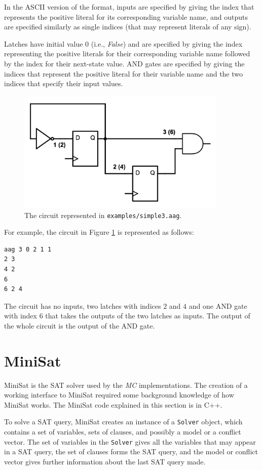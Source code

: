 \documentclass[12pt,a4paper,twoside,openright]{report}
\begin{document}
{{In the ASCII version of the format, inputs are specified by giving the
index that represents the positive literal for its corresponding variable name,
and outputs are specified similarly as single indices (that may represent
literals of any sign).

Latches have initial value 0 (i.e., {\it False}) and are specified by giving the
index representing the positive literals for their corresponding variable name
followed by the index for their next-state value.
AND gates are specified by giving the indices that represent the positive literal
for their variable name and the two indices that specify their input values.

\begin{figure}[t]
\centering
\includegraphics[width=100mm]{circuit.png}
\caption{The circuit represented in {\tt examples/simple3.aag}.}
\label{aagCircuit}
\end{figure}

For example, the circuit in Figure \ref{aagCircuit} is represented
as follows:
\begin{verbatim}
aag 3 0 2 1 1
2 3
4 2
6
6 2 4
\end{verbatim}
The circuit has no inputs, two latches with indices $2$ and $4$ and one AND gate
with index $6$ that takes the outputs of the two latches as inputs.
The output of the whole circuit is the output of the AND gate.
}


\section{MiniSat}
\label{prep:minisat}

MiniSat is the SAT solver used by the \emph{MC} implementations. The creation of a
working interface to MiniSat required some background knowledge of how MiniSat
works. The MiniSat code explained in this section is in C++.

To solve a SAT query, MiniSat creates an instance of a \verb,Solver, object,
which contains a set of variables, sets of clauses, and possibly a model or a conflict vector.
The set of variables in the \verb,Solver, gives all the variables that may appear in
a SAT query, the set of clauses forms the SAT query, and the model or conflict vector
gives further information about the last SAT query made.

}
\end{document}
